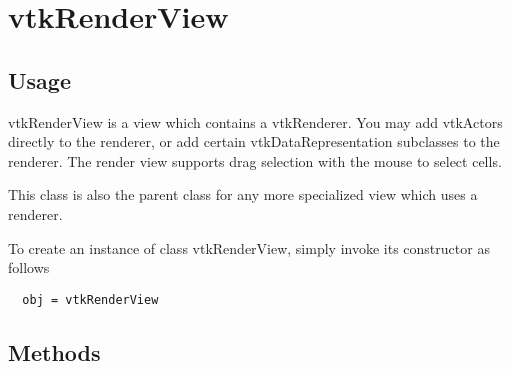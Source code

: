 \section{vtkRenderView}

\subsection{Usage}

 vtkRenderView is a view which contains a vtkRenderer.  You may add vtkActors
 directly to the renderer, or add certain vtkDataRepresentation subclasses
 to the renderer.  The render view supports drag selection with the mouse to
 select cells.

 This class is also the parent class for any more specialized view which uses
 a renderer.

To create an instance of class vtkRenderView, simply
invoke its constructor as follows
\begin{verbatim}
  obj = vtkRenderView
\end{verbatim}
\subsection{Methods}

